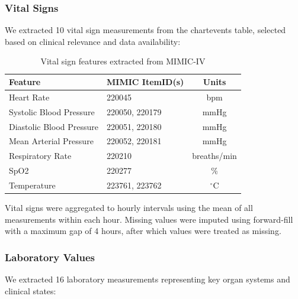\subsubsection{Vital Signs}

We extracted 10 vital sign measurements from the chartevents table, selected based on clinical relevance and data availability:

\begin{table}[H]
\centering
\caption{Vital sign features extracted from MIMIC-IV}
\label{tab:vitals}
\begin{tabular}{llc}
\toprule
\textbf{Feature} & \textbf{MIMIC ItemID(s)} & \textbf{Units} \\
\midrule
Heart Rate & 220045 & bpm \\
Systolic Blood Pressure & 220050, 220179 & mmHg \\
Diastolic Blood Pressure & 220051, 220180 & mmHg \\
Mean Arterial Pressure & 220052, 220181 & mmHg \\
Respiratory Rate & 220210 & breaths/min \\
SpO2 & 220277 & \% \\
Temperature & 223761, 223762 & $^\circ$C \\
\bottomrule
\end{tabular}
\end{table}

Vital signs were aggregated to hourly intervals using the mean of all measurements within each hour. Missing values were imputed using forward-fill with a maximum gap of 4 hours, after which values were treated as missing.

\subsubsection{Laboratory Values}

We extracted 16 laboratory measurements representing key organ systems and clinical states:

